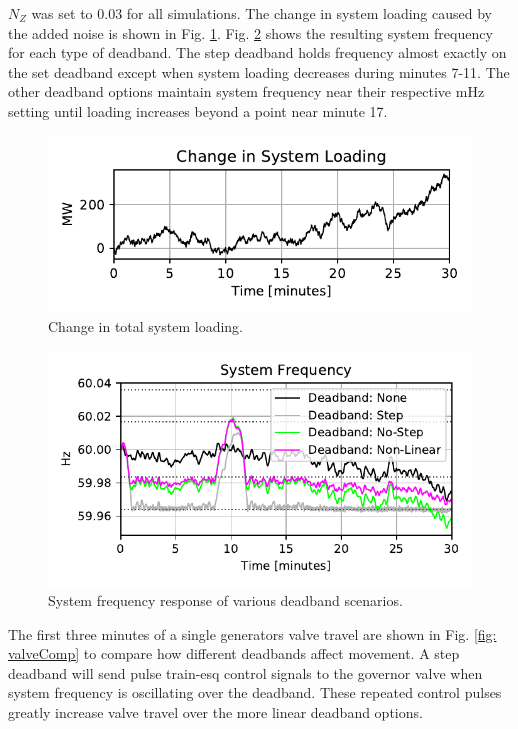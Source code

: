 $N_Z$ was set to 0.03 for all simulations. 
The change in system loading caused by the added noise is shown in Fig. \ref{fig: systemLoading}.
Fig. \ref{fig: sysFreqDB} shows the resulting system frequency for each type of deadband.
The step deadband holds frequency almost exactly on the set deadband except when system loading decreases during minutes 7-11.
The other deadband options maintain system frequency near their respective mHz setting until loading increases beyond a point near minute 17.


\begin{figure}[!ht]
\centering
\includegraphics[width=\linewidth]{figures/miniWECCuniAccPloadChange}
\caption{Change in total system loading.}
\label{fig: systemLoading}
\end{figure}

\begin{figure}[!ht]
\centering
\includegraphics[width=\linewidth]{figures/miniWECCnoiseNLdroopDBFreq}
\caption{System frequency response of various deadband scenarios.}
\label{fig: sysFreqDB}
\end{figure}

The first three minutes of a single generators valve travel are shown in Fig. \ref{fig: valveComp} to compare how different deadbands affect movement.
A step deadband will send pulse train-esq control signals to the governor valve when system frequency is oscillating over the deadband. 
These repeated control pulses greatly increase valve travel over the more linear deadband options.


